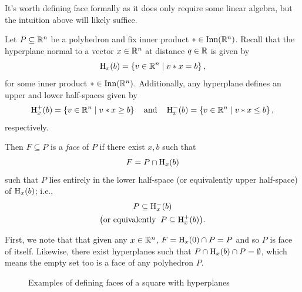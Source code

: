 \documentclass[12pt,oneside]{../../sfsuthesis}
\begin{document}
It's worth defining face formally as it does only require some linear algebra, but the intuition above will likely suffice.
\begin{definition}[Face]\th\label{def:face}
    Let \( P \subseteq \mathbb{R}^n \) be a polyhedron and fix inner product \( \ast \in \operatorname{Inn}(\mathbb{R}^n) \).
    Recall that the hyperplane normal to a vector \( x \in \mathbb{R}^n \) at distance \( q \in \mathbb{R} \)  is given by
    \[
        \operatorname{H}_x(b) = \left\{ v \in \mathbb{R}^n \; \middle| \; v \ast x = b \right\},
    \]
    for some inner product \(\ast \in \operatorname{Inn}(\mathbb{R}^n) \).
    Additionally, any hyperplane defines an upper and lower half-spaces given by
    \[
        \operatorname{H}^{+}_x(b) = \left\{ v \in \mathbb{R}^n \; \middle| \; v \ast x \geq b \right\} \quad \text{and} \quad \operatorname{H}^{-}_x(b) = \left\{ v \in \mathbb{R}^n \; \middle| \; v \ast x \leq b \right\},
    \]
    respectively.

    Then \( F \subseteq P \) is a \emph{face} of \( P \) if there exist \( x, b \) such that
    \[
        F = P \cap \operatorname{H}_x(b)
    \]
    such that \( P \) lies entirely in the lower half-space (or equivalently upper half-space) of \( \operatorname{H}_x(b) \); i.e.,
    \begin{gather*}
        P \subseteq \operatorname{H}^{-}_x(b) \\
        \big( \text{or equivalently} \;\; P \subseteq \operatorname{H}^{+}_x(b) \big).
    \end{gather*}

\end{definition}
First, we note that that given any \( x \in \mathbb{R}^n \), \( F = \operatorname{H}_x(0) \cap P = P \) and so \( P \) is face of itself.
Likewise, there exist hyperplanes such that \( P \cap \operatorname{H}_x(b) \cap P = \emptyset \), which means the empty set too is a face of any polyhedron \( P \).
\begin{figure}[H]
    \centering
    \caption{Examples of defining faces of a square with hyperplanes}
\end{figure}
\end{document}
